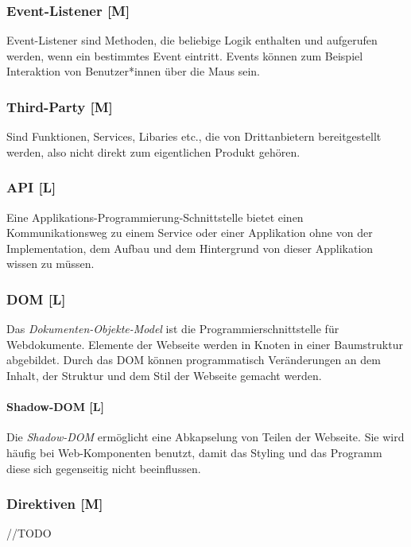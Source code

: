 \subsubsection{Event-Listener [M]}
\label{txt:glos:event-listener}
Event-Listener sind Methoden, die beliebige Logik enthalten und aufgerufen werden, wenn ein bestimmtes Event eintritt. Events können zum Beispiel Interaktion von Benutzer*innen über die Maus sein. 

\subsubsection{Third-Party [M]}
Sind Funktionen, Services, Libaries etc., die von Drittanbietern bereitgestellt werden, also nicht direkt zum eigentlichen Produkt gehören. 

\subsubsection{API [L]}
\label{txt:glos:API}
Eine Applikations-Programmierung-Schnittstelle bietet einen Kommunikationsweg zu einem Service oder einer Applikation ohne von der Implementation, dem Aufbau und dem Hintergrund von dieser Applikation wissen zu müssen. \cite{WhatApi}

\subsubsection{DOM [L]}
\label{glos:dom}
Das \emph{Dokumenten-Objekte-Model} ist die Programmierschnittstelle für Webdokumente. Elemente der Webseite werden in Knoten in einer Baumstruktur abgebildet. Durch das DOM können programmatisch Veränderungen an dem Inhalt, der Struktur und dem Stil der Webseite gemacht werden. \cite{WhatDOM}

\paragraph{Shadow-DOM [L]}
Die \emph{Shadow-DOM} ermöglicht eine Abkapselung von Teilen der Webseite. Sie wird häufig bei Web-Komponenten benutzt, damit das Styling und das Programm diese sich gegenseitig nicht beeinflussen. \cite{WhatShadowDOM}


\subsubsection{Direktiven [M]}
//TODO

